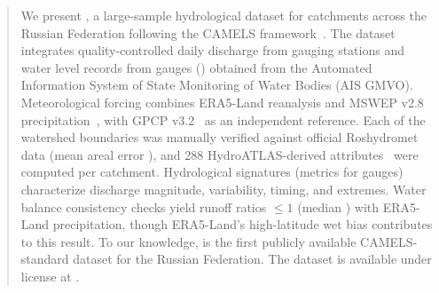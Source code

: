 \begin{abstract}
We present \dataset, a large-sample hydrological dataset for \ntotal catchments across the Russian Federation following the CAMELS framework~\citep{Addor2017}.
The dataset integrates quality-controlled daily discharge from \ndischarge gauging stations and water level records from \nwaterlevel gauges (\years) obtained from the Automated Information System of State Monitoring of Water Bodies (AIS GMVO).
Meteorological forcing combines ERA5-Land reanalysis and MSWEP v2.8 precipitation~\citep{Beck2019MSWEP}, with GPCP v3.2~\citep{Huffman2019} as an independent reference.
Each of the \ntotal watershed boundaries was manually verified against official Roshydromet data (mean areal error \meanerror), and 288 HydroATLAS-derived attributes~\citep{Linke2019} were computed per catchment.
Hydrological signatures (\nsignatures metrics for \nsigngauges gauges) characterize discharge magnitude, variability, timing, and extremes.
Water balance consistency checks yield runoff ratios $\leq 1$ (median \medianrunoffratio) with ERA5-Land precipitation, though ERA5-Land's high-latitude wet bias contributes to this result.
To our knowledge, \dataset is the first publicly available CAMELS-standard dataset for the Russian Federation.
The dataset is available under \license license at \placeholder{[DOI]}.
\end{abstract}
